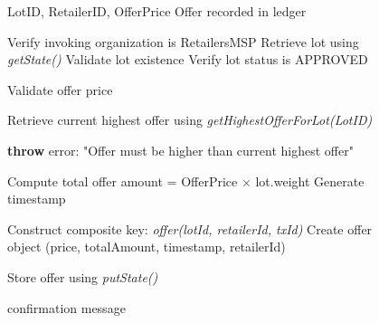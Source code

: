 \documentclass[12pt]{article}
\begin{document}
\begin{figure}[h]
\begin{minipage}[t]{0.48\linewidth}
\begin{algorithm}[H]
\begin{algorithmic}[1]
					\Require LotID, RetailerID, OfferPrice
					\Ensure Offer recorded in ledger
					
					\State Verify invoking organization is RetailersMSP
					\State Retrieve lot using \textit{getState()}
					\State Validate lot existence
					\State Verify lot status is APPROVED
					
					\State Validate offer price
					
					\State Retrieve current highest offer using \textit{getHighestOfferForLot(LotID)}
					
					\State \textbf{throw} error: "Offer must be higher than current highest offer"
					\EndIf
					
					\State Compute total offer amount = OfferPrice $\times$ lot.weight
					\State Generate timestamp
					
					\State Construct composite key: \textit{offer(lotId, retailerId, txId)}
					\State Create offer object (price, totalAmount, timestamp, retailerId)
					
					\State Store offer using \textit{putState()}
					
					\State \Return confirmation message
					
				\end{algorithmic}
			\end{algorithm}
		\end{minipage}
		
	\end{figure}
	
\end{document}
